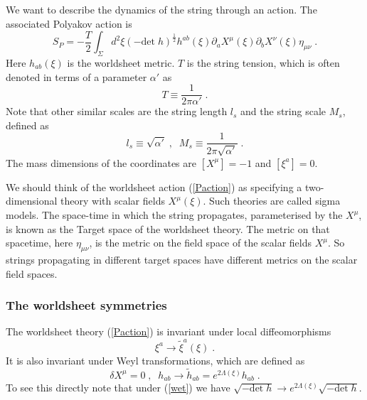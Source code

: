 \documentclass[11pt,a4paper]{article}
\numberwithin{equation}{section}
\numberwithin{table}{section}\setlength{\multlinegap}{25pt}
\newcommand{\be}{\begin{equation}}
\newcommand{\ee}{\end{equation}}
\begin{document}
We want to describe the dynamics of the string through an action. The associated Polyakov action is
\be
S_P = -\frac{T}{2} \int_{\Sigma} d^2 \xi \left( - \mathrm{det}\; h \right)^{\frac12} h^{ab}\left( \xi \right) \partial_a X^{\mu}\left(\xi \right) \partial_b X^{\nu}\left(\xi \right) \eta_{\mu\nu} \;.
\label{Paction}
\ee
Here $h_{ab}\left(\xi \right)$ is the worldsheet metric. $T$ is the string tension, which is often denoted in terms of a parameter $\alpha'$ as
\be
T \equiv \frac{1}{2 \pi \alpha'} \;.
\ee
Note that other similar scales are the string length $l_s$ and the string scale $M_s$, defined as
\be
l_s \equiv \sqrt{\alpha'} \;,\;\; M_s \equiv \frac{1}{2\pi\sqrt{\alpha'}} \;.
\ee
The mass dimensions of the coordinates are $\left[X^{\mu}\right]=-1$ and $\left[\xi^a\right]=0$.

We should think of the worldsheet action (\ref{Paction}) as specifying a two-dimensional theory with scalar fields $X^{\mu}\left(\xi\right)$. Such theories are called sigma models. The space-time in which the string propagates, parameterised by the $X^{\mu}$, is known as the Target space of the worldsheet theory.  The metric on that spacetime, here $\eta_{\mu\nu}$, is the metric on the field space of the scalar fields $X^{\mu}$. So strings propagating in different target spaces have different metrics on the scalar field spaces. 

\subsubsection{The worldsheet symmetries}

The worldsheet theory (\ref{Paction}) is invariant under local diffeomorphisms
\be
\xi^a \rightarrow \tilde{\xi}^a\left(\xi\right) \;.
\label{WSdiff}
\ee
It is also invariant under Weyl transformations, which are defined as
\be
\delta X^{\mu} = 0 \;,\;\; h_{ab} \rightarrow \tilde{h}_{ab} = e^{2 \Lambda\left(\xi\right)} h_{ab} \;.
\label{wet}
\ee
To see this directly note that under (\ref{wet}) we have $\sqrt{-\mathrm{det}\;h} \rightarrow e^{2 \Lambda\left(\xi\right)} \sqrt{-\mathrm{det}\;h}$. 
\end{document}
